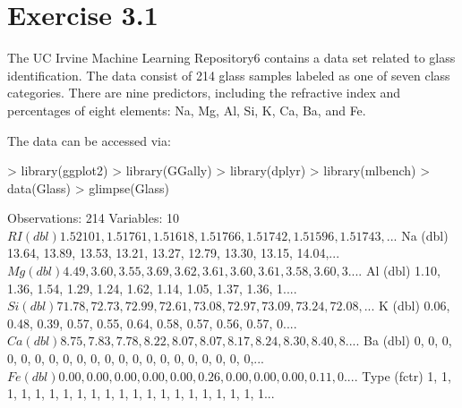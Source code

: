 \documentclass[12pt]{article}
\begin{document}

\maketitle



\section{Exercise 3.1}
The UC Irvine Machine Learning Repository6 contains a data set related to glass identification. The data consist of 214 glass samples labeled as one of seven class categories. There are nine predictors, including the refractive index and percentages of eight elements: Na, Mg, Al, Si, K, Ca, Ba, and Fe.

The data can be accessed via:
\begin{Schunk}
\begin{Sinput}
> library(ggplot2)
> library(GGally)
> library(dplyr)
> library(mlbench)
> data(Glass)
> glimpse(Glass)
\end{Sinput}
\begin{Soutput}
Observations: 214
Variables: 10
$ RI   (dbl) 1.52101, 1.51761, 1.51618, 1.51766, 1.51742, 1.51596, 1.51743,...
$ Na   (dbl) 13.64, 13.89, 13.53, 13.21, 13.27, 12.79, 13.30, 13.15, 14.04,...
$ Mg   (dbl) 4.49, 3.60, 3.55, 3.69, 3.62, 3.61, 3.60, 3.61, 3.58, 3.60, 3....
$ Al   (dbl) 1.10, 1.36, 1.54, 1.29, 1.24, 1.62, 1.14, 1.05, 1.37, 1.36, 1....
$ Si   (dbl) 71.78, 72.73, 72.99, 72.61, 73.08, 72.97, 73.09, 73.24, 72.08,...
$ K    (dbl) 0.06, 0.48, 0.39, 0.57, 0.55, 0.64, 0.58, 0.57, 0.56, 0.57, 0....
$ Ca   (dbl) 8.75, 7.83, 7.78, 8.22, 8.07, 8.07, 8.17, 8.24, 8.30, 8.40, 8....
$ Ba   (dbl) 0, 0, 0, 0, 0, 0, 0, 0, 0, 0, 0, 0, 0, 0, 0, 0, 0, 0, 0, 0, 0,...
$ Fe   (dbl) 0.00, 0.00, 0.00, 0.00, 0.00, 0.26, 0.00, 0.00, 0.00, 0.11, 0....
$ Type (fctr) 1, 1, 1, 1, 1, 1, 1, 1, 1, 1, 1, 1, 1, 1, 1, 1, 1, 1, 1, 1, 1...
\end{Soutput}
\end{Schunk}
\end{document}
